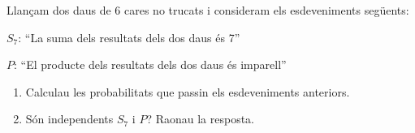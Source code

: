 \documentclass[11pt, a4paper, pdf]{book}
\begin{document}
\begin{mylist}
\item Llançam dos daus de 6 cares no trucats i consideram els esdeveniments següents:

\quad 
\quad $S_7$: ``La suma dels resultats dels dos daus és 7''


\quad 
\quad $P$: ``El producte dels resultats dels dos daus és imparell''

\begin{enumerate}
	\item Calculau les probabilitats que passin els esdeveniments anteriors.
	\item Són independents $S_7$ i $P$? Raonau la resposta.
\end{enumerate}


\end{mylist}
\end{document}
